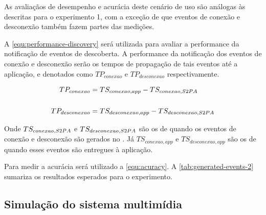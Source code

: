 As avaliaçãos de desempenho e acurácia deste cenário de uso são análogas às descritas para o experimento 1, com a exceção de que eventos de conexão e desconexão também fazem partes das medições.

A \autoref{equ:performance-discovery} será utilizada para avaliar a performance da notificação de eventos de descoberta. A performance da notificação dos eventos de conexão e desconexão serão os tempos de propagação de tais eventos até a aplicação, e denotados como $TP_{conexao}$ e $TP_{desconexao}$ respectivamente.

\begin{align}
	TP_{conexao} &= TS_{conexao,app} - TS_{conexao,S2PA} \label{equ:performance-connection} \\
	\nonumber\\
	TP_{desconexao} &= TS_{desconexao,app} - TS_{desconexao,S2PA} \label{equ:performance-disconnection}
\end{align}

Onde $TS_{conexao,S2PA}$ e $TS_{desconexao,S2PA}$ são os \timestamps de quando os eventos de conexão e desconexão são gerados no \stwopa. Já $TS_{conexao,app}$ e $TS_{desconexao,app}$ são os \timestamps de quando esses eventos são entregues à aplicação.

Para medir a acurácia será utilizado a \autoref{equ:acuracy}. A \autoref{tab:generated-events-2} sumariza os resultados esperados para o experimento.

\begin{table}[htb]
	\begin{center}
	\end{center}
\end{table}

\subsection{Simulação do sistema multimídia}

